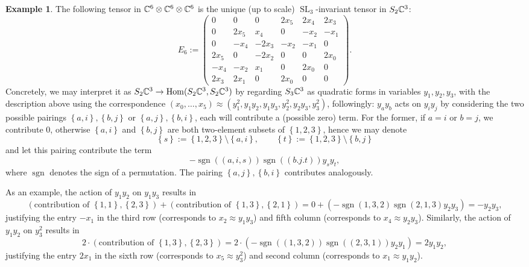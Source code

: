 \documentclass[a4paper,10pt]{article}
\def\zav#1{\left(#1\right)}
\def\set#1{\left\{#1\right\}}
\def\mtrx#1{\begin{pmatrix}#1\end{pmatrix}}
\DeclareMathOperator{\Hom}{Hom}\let\hom\Hom
\DeclareMathOperator{\SL}{SL}
\DeclareMathOperator{\sgn}{sgn}
\theoremstyle{definition}
\newtheorem{example}[theorem]{Example}
\theoremstyle{remark}
\begin{document}
\begin{example}
The following tensor in $\ce^6\otimes\ce^6\otimes\ce^6$ is the unique (up to scale) $\SL_3$-invariant tensor in $S_2\ce^3$:
\[
    E_6 := \mtrx{
            0  &   0    & 0 &  2x_5 & 2x_4 & 2x_3 \\
            0 & 2x_5   & x_4 &    0 &  -x_2 &  -x_1 \\
            0 &  -x_4 & -2x_3 &  -x_2 &  -x_1 &    0 \\
        2x_5  &   0 & -2x_2   &  0  &   0 & 2x_0 \\
        -x_4  & -x_2  &  x_1  &   0 & 2x_0 &    0 \\
        2x_3 & 2x_1  &   0 & 2x_0 &    0  &   0
    }.
\]
Concretely, we may interpret it as $S_2\ce^3\to \Hom(S_2\ce^3, S_2\ce^3)$ by regarding $S_3\ce^3$ as quadratic forms in variables $y_1,y_2,y_3$, with the description above using the correspondence $(x_0,\dots,x_5)\approx(y_1^2, y_1y_2, y_1y_3,y_2^2,y_2y_3,y_3^2)$, followingly: $y_ay_b$ acts on $y_iy_j$ by considering the two possible pairings $\set{a,i},\set{b,j}$ or $\set{a,j},\set{b,i}$, each will contribute a (possible zero) term. For the former, if $a=i$ or $b=j$, we contribute $0$, otherwise $\set{a,i}$ and $\set{b,j}$ are both two-element subsets of $\set{1,2,3}$, hence we may denote
\[
    \set{s} := \set{1,2,3}\setminus\set{a,i},\qquad \set{t}:=\set{1,2,3}\setminus\set{b,j}
\]
and let this pairing contribute the term
\[
    -\sgn((a,i,s))\sgn((b.j.t))y_sy_t,
\]
where $\sgn$ denotes the sign of a permutation. The pairing $\set{a,j},\set{b,i}$ contributes analogously.

As an example, the action of $y_1y_2$ on $y_1y_3$ results in
\[
    \zav{\text{contribution of $\set{1,1},\set{2,3}$}} + \zav{\text{contribution of $\set{1,3},\set{2,1}$}} = 0 + \zav{-\sgn(1,3,2)\sgn(2,1,3)y_2y_3} = -y_2y_3,
\]
justifying the entry $-x_1$ in the third row (corresponds to $x_2\approx y_1y_3$) and fifth column (corresponds to $x_4\approx y_2y_3$). Similarly, the action of $y_1y_2$ on $y_3^2$ results in
\[
    2\cdot\zav{\text{contribution of $\set{1,3},\set{2,3}$}} = 2\cdot (-\sgn((1,3,2))\sgn((2,3,1))y_2y_1) = 2y_1y_2,
\]
justifying the entry $2x_1$ in the sixth row (corresponds to $x_5\approx y_3^2$) and second column (corresponds to $x_1\approx y_1y_2$).


\end{example}
\end{document}

